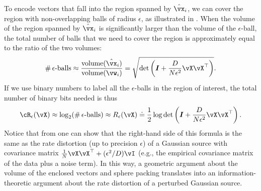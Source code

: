 \documentclass[../../book-main.tex]{subfiles}
\begin{document}
To encode vectors that fall into the region spanned by $\hat \vx_i$,
we can cover the region with non-overlapping
balls of radius $\epsilon$, as illustrated in
. When the volume of the region spanned by
$\hat \vx_i$ is significantly larger than the volume of the
$\epsilon$-ball, the total number of balls that we need to cover the region is
approximately equal to the ratio of the two volumes:
\begin{equation}
    \# \,\epsilon\mbox{-balls} \approx \frac{\mbox{volume}(\hat
    \vx_i)}{\mbox{volume}(\vw_i)} = \sqrt{\det\left(\boldsymbol{I} +
    \frac{D}{N\epsilon^2} \vX\vX^\top  \right)}.
\end{equation}
If we use binary numbers to label all the $\epsilon$-balls in the region of
interest, the total number of binary bits needed is thus %
\begin{equation}
    \cR_{\epsilon}(\vX) \approx %
    \log_2 (\# \,\epsilon\mbox{-balls}) \approx R_{\epsilon}(\vX)
    \doteq \frac{1}{2} \log \det \left(\boldsymbol{I} +
    \frac{D}{N\epsilon^2} \vX\vX^\top \right).
    \label{eqn:rate-Gaussian}
\end{equation}
Notice that from  one can show that
the right-hand side of this formula is the same as the rate
distortion (up to precision \(\epsilon\)) of a Gaussian source with
covariance matrix \(\frac{1}{N} \vX\vX^\top + (\epsilon^{2}/D) \vI\)
(e.g., the empirical covariance matrix of the data plus a noise
term). In this way, a geometric argument about the volume of the
enclosed vectors and sphere packing translates into an
information-theoretic argument about the rate distortion of a
perturbed Gaussian source.
\end{document}

